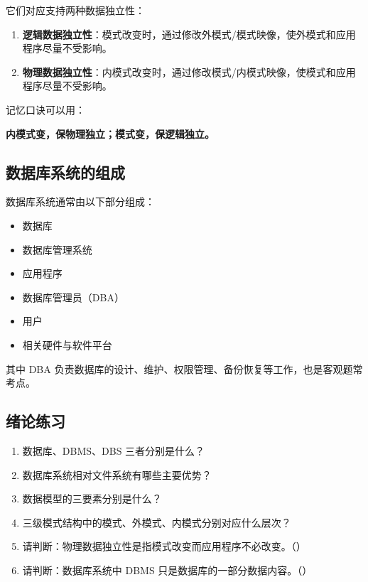 \documentclass{../../note}
\begin{document}
它们对应支持两种数据独立性：

\begin{enumerate}
  \item \textbf{逻辑数据独立性}：模式改变时，通过修改外模式/模式映像，使外模式和应用程序尽量不受影响。
  \item \textbf{物理数据独立性}：内模式改变时，通过修改模式/内模式映像，使模式和应用程序尽量不受影响。
\end{enumerate}

记忆口诀可以用：

\begin{center}
\textbf{内模式变，保物理独立；模式变，保逻辑独立。}
\end{center}

\subsection{数据库系统的组成}

数据库系统通常由以下部分组成：

\begin{itemize}
  \item 数据库
  \item 数据库管理系统
  \item 应用程序
  \item 数据库管理员（DBA）
  \item 用户
  \item 相关硬件与软件平台
\end{itemize}

其中 DBA 负责数据库的设计、维护、权限管理、备份恢复等工作，也是客观题常考点。

\subsection{绪论练习}

\begin{enumerate}
  \item 数据库、DBMS、DBS 三者分别是什么？
  \item 数据库系统相对文件系统有哪些主要优势？
  \item 数据模型的三要素分别是什么？
  \item 三级模式结构中的模式、外模式、内模式分别对应什么层次？
  \item 请判断：物理数据独立性是指模式改变而应用程序不必改变。（\hspace{1cm}）
  \item 请判断：数据库系统中 DBMS 只是数据库的一部分数据内容。（\hspace{1cm}）
\end{enumerate}
\end{document}
